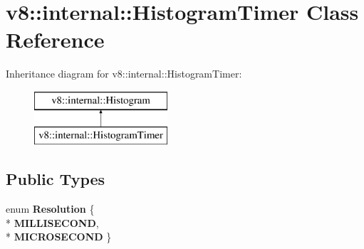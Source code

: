\hypertarget{classv8_1_1internal_1_1_histogram_timer}{}\section{v8\+:\+:internal\+:\+:Histogram\+Timer Class Reference}
\label{classv8_1_1internal_1_1_histogram_timer}
Inheritance diagram for v8\+:\+:internal\+:\+:Histogram\+Timer\+:\begin{figure}[H]
\begin{center}
\leavevmode
\includegraphics[height=2.000000cm]{classv8_1_1internal_1_1_histogram_timer}
\end{center}
\end{figure}
\subsection*{Public Types}
\begin{DoxyCompactItemize}
\item 
enum {\bfseries Resolution} \{ \\*
{\bfseries M\+I\+L\+L\+I\+S\+E\+C\+O\+ND}, 
\\*
{\bfseries M\+I\+C\+R\+O\+S\+E\+C\+O\+ND}
 \}\hypertarget{classv8_1_1internal_1_1_histogram_timer_aaac1deda5d7cd6f2ee2d8f396193db9b}{}\label{classv8_1_1internal_1_1_histogram_timer_aaac1deda5d7cd6f2ee2d8f396193db9b}

\end{DoxyCompactItemize}
